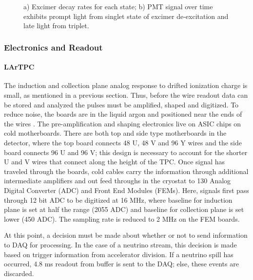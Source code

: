 \documentclass[12pt]{article}
\begin{document}
\begin{figure}[h!]
\centering
{}
\hspace{2 mm}
\caption{ a) Excimer decay rates for each state; b) PMT signal over time exhibits prompt light from singlet state of excimer de-excitation and late light from triplet. } 
\label{fig:light}
\end{figure}

\subsubsection{Electronics and Readout}
\paragraph{LArTPC}
The induction and collection plane analog response to drifted ionization charge is small, as mentioned in a previous section.  Thus, before the wire readout data can be stored and analyzed the pulses must be amplified, shaped and digitized.  To reduce noise, the boards are in the liquid argon and positioned near the ends of the wires \cite{bib:uboone_JINST}. The pre-amplification and shaping electronics live on ASIC chips on cold motherboards. There are both top and side type motherboards in the detector, where the top board connects 48 U, 48 V and 96 Y wires and the side board connects 96 U and 96 V; this design is necessary to account for the shorter U and V wires that connect along the height of the TPC. Once signal has traveled through the boards, cold cables carry the information through additional intermediate amplifiers and out feed throughs in the cryostat to 130 Analog Digital Converter (ADC) and Front End Modules (FEMs). Here, signals first pass through 12 bit ADC to be digitized at 16 MHz, where baseline for induction plane is set at half the range (2055 ADC) and baseline for collection plane is set lower (450 ADC). The sampling rate is reduced to 2 MHz on the FEM boards.
\par At this point, a decision must be made about whether or not to send information to DAQ for processing. In the case of a neutrino stream, this decision is made based on trigger information from accelerator division. If a neutrino spill has occurred, 4.8 ms readout from buffer is sent to the DAQ; else, these events are discarded. 
\end{document}
